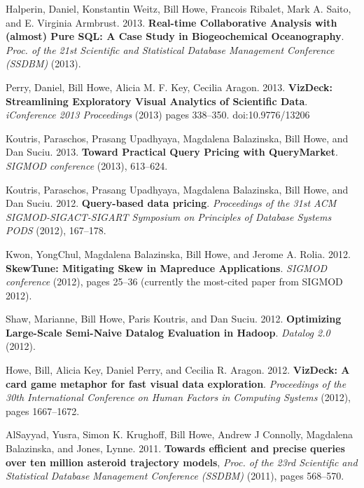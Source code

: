 \begin{bulletlist}
\item Halperin, Daniel, Konstantin Weitz, Bill Howe, Francois Ribalet, Mark A. Saito,
and E. Virginia Armbrust. 2013. \textbf{Real-time Collaborative Analysis with
(almost) Pure SQL: A Case Study in Biogeochemical Oceanography}.
\emph{Proc. of the 21st Scientific and Statistical
Database Management Conference (SSDBM)} (2013). 

\item Perry, Daniel, Bill Howe, Alicia M. F. Key, Cecilia Aragon. 2013. 
\textbf{VizDeck: Streamlining Exploratory Visual Analytics of Scientific Data}.
\emph{iConference 2013 Proceedings} (2013) pages 338--350. doi:10.9776/13206 

\item Koutris, Paraschos, Prasang Upadhyaya, Magdalena
Balazinska, Bill Howe, and Dan Suciu. 2013. \textbf{Toward Practical Query
Pricing with QueryMarket}. \emph{SIGMOD conference} (2013), 613--624.

\item Koutris, Paraschos, Prasang Upadhyaya, Magdalena Balazinska, Bill
Howe, and Dan Suciu. 2012. \textbf{Query-based data pricing}. \emph{Proceedings of the 31st ACM SIGMOD-SIGACT-SIGART Symposium on Principles of Database Systems {PODS}} (2012),
167--178. 

\item Kwon, YongChul, Magdalena
Balazinska, Bill Howe, and Jerome A. Rolia. 2012. \textbf{SkewTune: Mitigating
Skew in Mapreduce Applications}. \emph{SIGMOD conference} (2012), pages 25--36 (currently the most-cited paper from SIGMOD 2012).

\item Shaw, Marianne, Bill Howe, Paris Koutris, and
Dan Suciu. 2012. \textbf{Optimizing Large-Scale Semi-Naive Datalog Evaluation in
Hadoop}. \emph{Datalog 2.0} (2012). 

\item Howe, Bill, Alicia Key, Daniel Perry, and Cecilia R. Aragon. 2012. 
\textbf{VizDeck: A card game metaphor for fast visual data exploration}. \emph{Proceedings of the 30th International Conference on Human Factors in Computing Systems} (2012), pages 1667--1672. 

\item AlSayyad, Yusra, Simon K. Krughoff, Bill Howe, Andrew J Connolly, Magdalena Balazinska,
and Jones, Lynne. 2011. \textbf{Towards efficient and precise queries over ten million asteroid trajectory models}, \emph{Proc. of the 23rd Scientific and Statistical
Database Management Conference (SSDBM)} (2011), pages 568--570.


\end{bulletlist}
